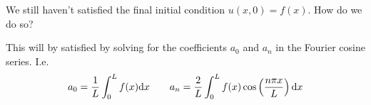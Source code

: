 We still haven't satisfied the final initial condition $u(x, 0) = f(x)$. How do we
do so?

\soln*
This will by satisfied by solving for the coefficients $a_0$ and $a_n$ in the Fourier cosine series. I.e.
$$a_0 = \over{L}\int_0^L f(x) \dd x \qquad a_n = \frac{2}{L} \intl f(x) \cosp{\npxl}\dd x$$ 